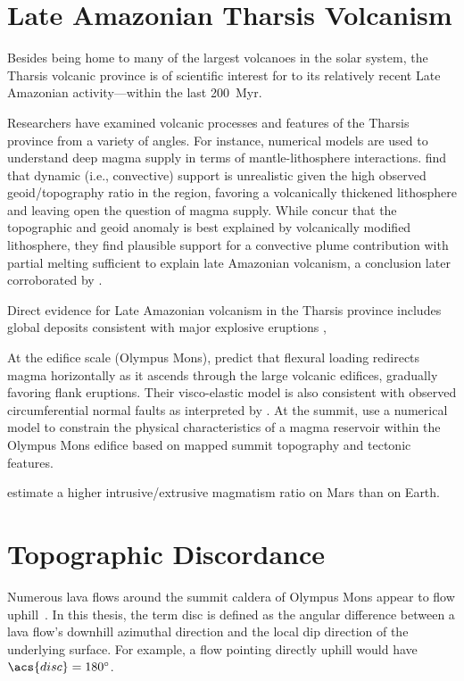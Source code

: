 \section{Late Amazonian Tharsis Volcanism}

Besides being home to many of the largest volcanoes in the solar system, the Tharsis volcanic province is of scientific interest for to its relatively recent Late Amazonian activity---within the last \qty{200}{Myr}.

Researchers have examined volcanic processes and features of the Tharsis province from a variety of angles. For instance, numerical models are used to understand deep magma supply in terms of mantle-lithosphere interactions. \textcite{roberts_plume-induced_2004} find that dynamic (i.e., convective) support is unrealistic given the high observed geoid/topography ratio in the region, favoring a volcanically thickened lithosphere and leaving open the question of magma supply. While \textcite{redmond_numerical_2004} concur that the topographic and geoid anomaly is best explained by volcanically modified lithosphere, they find plausible support for a convective plume contribution with partial melting sufficient to explain late Amazonian volcanism, a conclusion later corroborated by \textcite{plesa_thermal_2018}.

Direct evidence for Late Amazonian volcanism in the Tharsis province includes global deposits consistent with major explosive eruptions \parencite{hynek_explosive_2003},

At the edifice scale (Olympus Mons), \textcite{mcgovern_state_1993} predict that flexural loading redirects magma horizontally as it ascends through the large volcanic edifices, gradually favoring flank eruptions. Their visco-elastic model is also consistent with observed circumferential normal faults as interpreted by \textcite{thomas_flank_1990}. At the summit, \textcite{zuber_caldera_1992} use a numerical model to constrain the physical characteristics of a magma reservoir within the Olympus Mons edifice based on mapped summit topography and tectonic features.   

\textcite{black_eruptibility_2016} estimate a higher intrusive/extrusive magmatism ratio on Mars than on Earth.

\section{Topographic Discordance}

Numerous lava flows around the summit caldera of Olympus Mons appear to flow uphill~\parencite[Figure~\ref{fig:uphill-flows}; after][]{mouginis-mark_late-stage_2019}. In this thesis, the term \ac{disc} is defined as the angular difference between a lava flow's downhill azimuthal direction and the local dip direction of the underlying surface. For example, a flow pointing directly uphill would have $\acs{disc}=\ang{180}$. 

